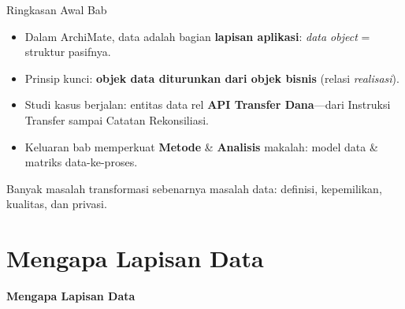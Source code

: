 \documentclass[aspectratio=169, table]{beamer}
\newcommand{\sectionframe}[1]{%
  \begin{frame}{\hfill}
    \centering
    \Huge{\textbf{#1}}
  \end{frame}
}
\newcommand{\takeaway}[1]{%
  \vspace{4pt}
  {\footnotesize #1}
}
\begin{document}
\begin{frame}{Ringkasan Awal Bab}
  \vspace{6pt}
  \begin{itemize}
    \item Dalam ArchiMate, data adalah bagian \textbf{lapisan aplikasi}:
          \emph{data object} = struktur pasifnya.
    \item Prinsip kunci: \textbf{objek data diturunkan dari objek bisnis}
          (relasi \emph{realisasi}).
    \item Studi kasus berjalan: entitas data rel \textbf{API Transfer Dana}---dari
          Instruksi Transfer sampai Catatan Rekonsiliasi.
    \item Keluaran bab memperkuat \textbf{Metode} \& \textbf{Analisis} makalah:
          model data \& matriks data-ke-proses.
  \end{itemize}
  \takeaway{Banyak masalah transformasi sebenarnya masalah data: definisi,
  kepemilikan, kualitas, dan privasi.}
\end{frame}

\section{Mengapa Lapisan Data}
\sectionframe{Mengapa Lapisan Data}
\end{document}
